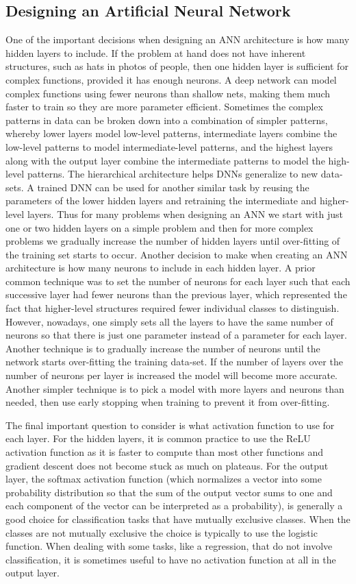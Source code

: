 \documentclass[\main/thesis.tex]{subfiles}
\begin{document}
\subsection{Designing an Artificial Neural Network}
One of the important decisions when designing an ANN architecture is how many hidden layers to include. If the problem at hand does not have inherent structures, such as hats in photos of people, then one hidden layer is sufficient for complex functions, provided it has enough neurons. A deep network can model complex functions using fewer neurons than shallow nets, making them much faster to train so they are more parameter efficient. Sometimes the complex patterns in data can be broken down into a combination of simpler patterns, whereby lower layers model low-level patterns, intermediate layers combine the low-level patterns to model intermediate-level patterns, and the highest layers along with the output layer combine the intermediate patterns to model the high-level patterns. The hierarchical architecture helps DNNs generalize to new data-sets. A trained DNN can be used for another similar task by reusing the parameters of the lower hidden layers and retraining the intermediate and higher-level layers. Thus for many problems when designing an ANN we start with just one or two hidden layers on a simple problem and then for more complex problems we gradually increase the number of hidden layers until over-fitting of the training set starts to occur. 
Another decision to make when creating an ANN architecture is how many neurons to include in each hidden layer. A prior common technique was to set the number of neurons for each layer such that each successive layer had fewer neurons than the previous layer, which represented the fact that higher-level structures required fewer individual classes to distinguish. However, nowadays, one simply sets all the layers to have the same number of neurons so that there is just one parameter instead of a parameter for each layer. Another technique is to gradually increase the number of neurons until the network starts over-fitting the training data-set. If the number of layers over the number of neurons per layer is increased the model will become more accurate. Another simpler technique is to pick a model with more layers and neurons than needed, then use early stopping when training to prevent it from over-fitting. 
 
The final important question to consider is what activation function to use for each layer. For the hidden layers, it is common practice to use the ReLU activation function as it is faster to compute than most other functions and gradient descent does not become stuck as much on plateaus. For the output layer, the softmax activation function (which normalizes a vector into some probability distribution so that the sum of the output vector sums to one and each component of the vector can be interpreted as a probability), is generally a good choice for classification tasks that have mutually exclusive classes. When the classes are not mutually exclusive the choice is typically to use the logistic function. When dealing with some tasks, like a regression, that do not involve classification, it is sometimes useful to have no activation function at all in the output layer. 
\end{document}
